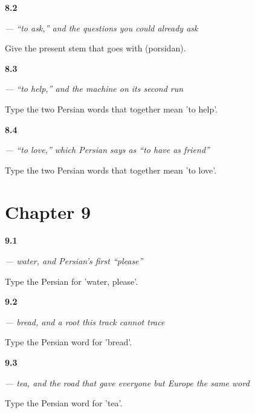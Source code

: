 \noindent\begin{minipage}[t]{\linewidth}
\raggedright
\hypertarget{review-FA-C08-porsidan-stem}{\textbf{8.2}} \emph{ — “to ask,” and the questions you could already ask}\par
\small Give the present stem that goes with  (porsidan).
\end{minipage}\par\medskip

\noindent\begin{minipage}[t]{\linewidth}
\raggedright
\hypertarget{review-FA-C08-komak-kardan-verb}{\textbf{8.3}} \emph{  — “to help,” and the machine on its second run}\par
\small Type the two Persian words that together mean 'to help'.
\end{minipage}\par\medskip

\noindent\begin{minipage}[t]{\linewidth}
\raggedright
\hypertarget{review-FA-C08-dust-dashtan-literal}{\textbf{8.4}} \emph{  — “to love,” which Persian says as “to have as friend”}\par
\small Type the two Persian words that together mean 'to love'.
\end{minipage}\par\medskip

\section*{Chapter 9}

\noindent\begin{minipage}[t]{\linewidth}
\raggedright
\hypertarget{review-FA-C09-ab-request}{\textbf{9.1}} \emph{ — water, and Persian's first \textquotedblleft{}please\textquotedblright{}}\par
\small Type the Persian for 'water, please'.
\end{minipage}\par\medskip

\noindent\begin{minipage}[t]{\linewidth}
\raggedright
\hypertarget{review-FA-C09-nan-request}{\textbf{9.2}} \emph{ — bread, and a root this track cannot trace}\par
\small Type the Persian word for 'bread'.
\end{minipage}\par\medskip

\noindent\begin{minipage}[t]{\linewidth}
\raggedright
\hypertarget{review-FA-C09-chay-request}{\textbf{9.3}} \emph{ — tea, and the road that gave everyone but Europe the same word}\par
\small Type the Persian word for 'tea'.
\end{minipage}\par\medskip

